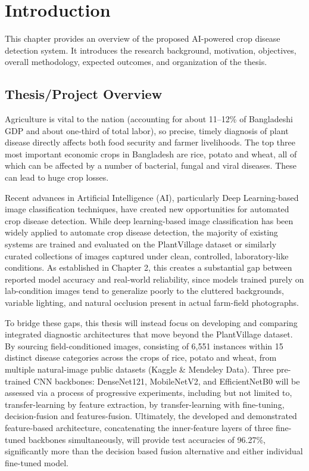 \chapter{Introduction}

This chapter provides an overview of the proposed AI-powered crop disease detection system. It introduces the research background, motivation, objectives, overall methodology, expected outcomes, and organization of the thesis.


\section{Thesis/Project Overview}

Agriculture is vital to the nation (accounting for about 11--12\% of Bangladeshi GDP and about one-third of total labor), so precise, timely diagnosis of plant disease directly affects both food security and farmer livelihoods. The top three most important economic crops in Bangladesh are rice, potato and wheat, all of which can be affected by a number of bacterial, fungal and viral diseases. These can lead to huge crop losses.

Recent advances in Artificial Intelligence (AI), particularly Deep Learning-based image classification techniques, have created new opportunities for automated crop disease detection. While deep learning-based image classification has been widely applied to automate crop disease detection, the majority of existing systems are trained and evaluated on the PlantVillage dataset or similarly curated collections of images captured under clean, controlled, laboratory-like conditions. As established in Chapter 2, this creates a substantial gap between reported model accuracy and real-world reliability, since models trained purely on lab-condition images tend to generalize poorly to the cluttered backgrounds, variable lighting, and natural occlusion present in actual farm-field photographs.

To bridge these gaps, this thesis will instead focus on developing and comparing integrated diagnostic architectures that move beyond the PlantVillage dataset. By sourcing field-conditioned images, consisting of 6,551 instances within 15 distinct disease categories across the crops of rice, potato and wheat, from multiple natural-image public datasets (Kaggle \& Mendeley Data). Three pre-trained CNN backbones: DenseNet121, MobileNetV2, and EfficientNetB0 will be assessed via a process of progressive experiments, including but not limited to, transfer-learning by feature extraction, by transfer-learning with fine-tuning, decision-fusion and features-fusion. Ultimately, the developed and demonstrated feature-based architecture, concatenating the inner-feature layers of three fine-tuned backbones simultaneously, will provide test accuracies of 96.27\%, significantly more than the decision based fusion alternative and either individual fine-tuned model.

